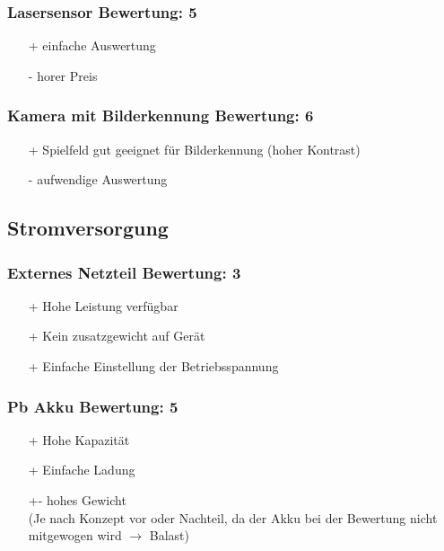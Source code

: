 \subsubsection{Lasersensor \hfill Bewertung: 5}
\begin{itemize}
    \item[+] einfache Auswertung
    \item[-] horer Preis
\end{itemize}

\subsubsection{Kamera mit Bilderkennung \hfill Bewertung: 6}
\begin{itemize}
    \item[+] Spielfeld gut geeignet für Bilderkennung (hoher Kontrast)
    \item[-] aufwendige Auswertung
\end{itemize}

\subsection{Stromversorgung}

\subsubsection{Externes Netzteil \hfill Bewertung: 3}
\begin{itemize}
    \item[+] Hohe Leistung verfügbar
    \item[+] Kein zusatzgewicht auf Gerät
    \item[+] Einfache Einstellung der Betriebsspannung
\end{itemize}

\subsubsection{Pb Akku \hfill Bewertung: 5}
\begin{itemize}
    \item[+] Hohe Kapazität
    \item[+] Einfache Ladung
    \item[+-]hohes Gewicht \\
        (Je nach Konzept vor oder Nachteil, da der Akku bei der Bewertung nicht mitgewogen wird 
        $\to$ Balast)
\end{itemize}

